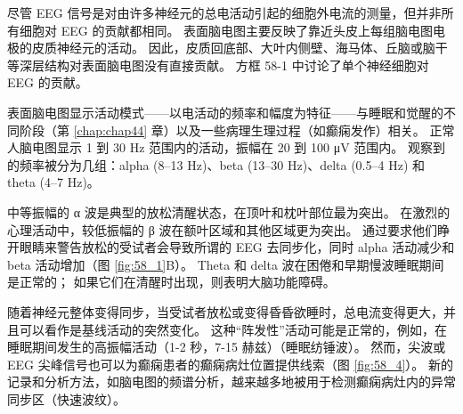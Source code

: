 尽管 EEG 信号是对由许多神经元的总电活动引起的细胞外电流的测量，但并非所有细胞对 EEG 的贡献都相同。 表面脑电图主要反映了靠近头皮上每组脑电图电极的皮质神经元的活动。 因此，皮质回底部、大叶内侧壁、海马体、丘脑或脑干等深层结构对表面脑电图没有直接贡献。 方框 58-1 中讨论了单个神经细胞对 EEG 的贡献。

表面脑电图显示活动模式——以电活动的频率和幅度为特征——与睡眠和觉醒的不同阶段（第 \ref{chap:chap44} 章）以及一些病理生理过程（如癫痫发作）相关。 正常人脑电图显示 1 到 30 Hz 范围内的活动，振幅在 20 到 100 μV 范围内。 观察到的频率被分为几组：alpha (8–13 Hz)、beta (13–30 Hz)、delta (0.5–4 Hz) 和 theta (4–7 Hz)。

中等振幅的 α 波是典型的放松清醒状态，在顶叶和枕叶部位最为突出。 在激烈的心理活动中，较低振幅的 β 波在额叶区域和其他区域更为突出。 通过要求他们睁开眼睛来警告放松的受试者会导致所谓的 EEG 去同步化，同时 alpha 活动减少和 beta 活动增加（图 \ref{fig:58_1}B）。 Theta 和 delta 波在困倦和早期慢波睡眠期间是正常的； 如果它们在清醒时出现，则表明大脑功能障碍。

随着神经元整体变得同步，当受试者放松或变得昏昏欲睡时，总电流变得更大，并且可以看作是基线活动的突然变化。 这种“阵发性”活动可能是正常的，例如，在睡眠期间发生的高振幅活动（1-2 秒，7-15 赫兹）（睡眠纺锤波）。 然而，尖波或 EEG 尖峰信号也可以为癫痫患者的癫痫病灶位置提供线索（图 \ref{fig:58_4}）。 新的记录和分析方法，如脑电图的频谱分析，越来越多地被用于检测癫痫病灶内的异常同步区（快速波纹）。

